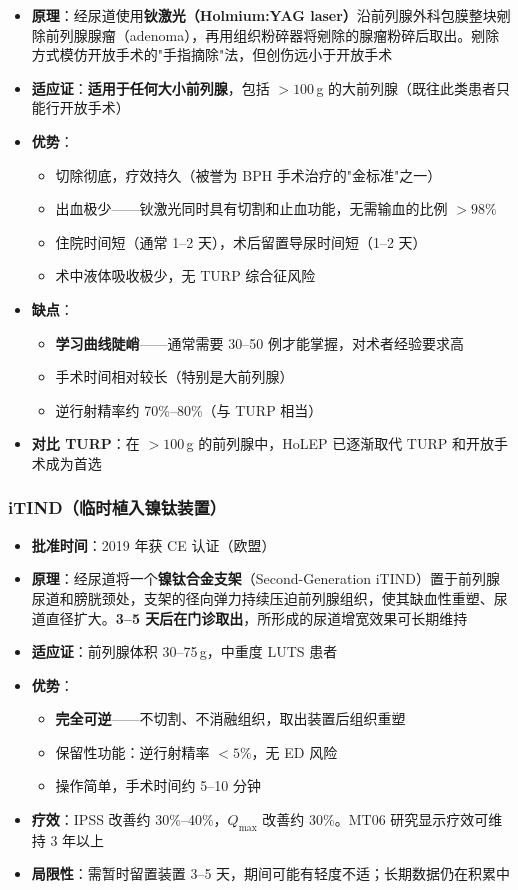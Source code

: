 \begin{enumerate}
\begin{itemize}[leftmargin=2cm]
	\item \textbf{原理}：经尿道使用\textbf{钬激光（Holmium:YAG laser）}沿前列腺外科包膜整块剜除前列腺腺瘤（adenoma），再用组织粉碎器将剜除的腺瘤粉碎后取出。剜除方式模仿开放手术的"手指摘除"法，但创伤远小于开放手术
	\item \textbf{适应证}：\textbf{适用于任何大小前列腺}，包括 $>100$\,g 的大前列腺（既往此类患者只能行开放手术）
	\item \textbf{优势}：
	\begin{itemize}
		\item 切除彻底，疗效持久（被誉为 BPH 手术治疗的"金标准"之一）
		\item 出血极少——钬激光同时具有切割和止血功能，无需输血的比例 $>98\%$
		\item 住院时间短（通常 1--2 天），术后留置导尿时间短（1--2 天）
		\item 术中液体吸收极少，无 TURP 综合征风险
	\end{itemize}
	\item \textbf{缺点}：
	\begin{itemize}
		\item \textbf{学习曲线陡峭}——通常需要 30--50 例才能掌握，对术者经验要求高
		\item 手术时间相对较长（特别是大前列腺）
		\item 逆行射精率约 70\%--80\%（与 TURP 相当）
	\end{itemize}
	\item \textbf{对比 TURP}：在 $>100$\,g 的前列腺中，HoLEP 已逐渐取代 TURP 和开放手术成为首选
\end{itemize}

\subsubsection{iTIND（临时植入镍钛装置）}

\begin{itemize}[leftmargin=2cm]
	\item \textbf{批准时间}：2019 年获 CE 认证（欧盟）
	\item \textbf{原理}：经尿道将一个\textbf{镍钛合金支架}（Second-Generation iTIND）置于前列腺尿道和膀胱颈处，支架的径向弹力持续压迫前列腺组织，使其缺血性重塑、尿道直径扩大。\textbf{3--5 天后在门诊取出}，所形成的尿道增宽效果可长期维持
	\item \textbf{适应证}：前列腺体积 30--75\,g，中重度 LUTS 患者
	\item \textbf{优势}：
	\begin{itemize}
		\item \textbf{完全可逆}——不切割、不消融组织，取出装置后组织重塑
		\item 保留性功能：逆行射精率 $<5\%$，无 ED 风险
		\item 操作简单，手术时间约 5--10 分钟
	\end{itemize}
	\item \textbf{疗效}：IPSS 改善约 30\%--40\%，$Q_{\max}$ 改善约 30\%。MT06 研究显示疗效可维持 3 年以上
	\item \textbf{局限性}：需暂时留置装置 3--5 天，期间可能有轻度不适；长期数据仍在积累中
\end{itemize}


\end{enumerate}
